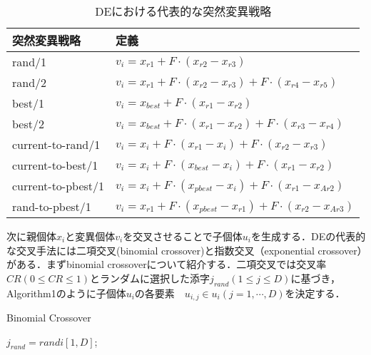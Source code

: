 \documentclass[a4paper,11pt,oneside,openany]{jsbook}
\begin{document}
\begin{table}[htb]
  \begin{center}
    \begin{tabular}{ll} \hline
      突然変異戦略　& 定義  \\ \hline
      rand/1 & $v_{i} = x_{r1} + F\cdot(x_{r2} - x_{r3})$ \\
      rand/2 & $v_{i} = x_{r1} + F\cdot(x_{r2} - x_{r3}) + F\cdot(x_{r4} - x_{r5})$ \\
      best/1 & $v_{i} = x_{best} + F\cdot(x_{r1} - x_{r2})$ \\
      best/2 & $v_{i} = x_{best} + F\cdot(x_{r1} - x_{r2}) + F\cdot(x_{r3} - x_{r4})$ \\
      current-to-rand/1 & $v_{i} = x_{i} + F\cdot(x_{r1} - x_{i}) + F\cdot(x_{r2} - x_{r3})$ \\
      current-to-best/1 & $v_{i} = x_{i} + F\cdot(x_{best} - x_{i}) + F\cdot(x_{r1} - x_{r2})$ \\
      current-to-pbest/1 & $v_{i} = x_{i} + F\cdot(x_{pbest} - x_{i}) + F\cdot(x_{r1} - x_{Ar2})$ \\
      rand-to-pbest/1 & $v_{i} = x_{r1} + F\cdot(x_{pbest} - x_{r1}) + F\cdot(x_{r2} - x_{Ar3})$ \\ \hline
    \end{tabular}
    \caption{DEにおける代表的な突然変異戦略}
  \end{center}
\end{table}


次に親個体$x_i$と変異個体$v_i$を交叉させることで子個体$u_i$を生成する．DEの代表的な交叉手法には二項交叉(binomial crossover)と指数交叉（exponential crossover）がある．まずbinomial crossoverについて紹介する．二項交叉では交叉率$CR(0 \leq CR \leq 1)$とランダムに選択した添字$j_{rand}(1 \leq j \leq D)$に基づき，Algorithm1のように子個体$u_i$の各要素　$u_{i,j} \in u_{i}(j = 1, \cdots, D)$を決定する．

\begin{algorithm}                      
\caption{Binomial Crossover}         
\label{alg:pbnf}                          
\begin{algorithmic}  
\STATE $j_{rand} = randi[1, D]$;
  \IF {$rand[0,1)　\leq CR　|| j == j_{rand} $}
  \ELSE
  \ENDIF
\ENDFOR
\end{algorithmic}
\end{algorithm}　
\end{document}
